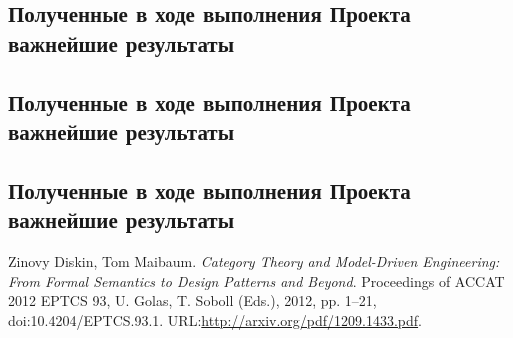 \documentclass[12pt,a4paper]{ltxdoc}
\begin{document}
\subsection{Полученные в ходе выполнения Проекта важнейшие результаты}
\subsection{Полученные в ходе выполнения Проекта важнейшие результаты}
\subsection{Полученные в ходе выполнения Проекта важнейшие результаты}




\begin{thebibliography}{9}
 Zinovy Diskin, Tom Maibaum. \emph{Category Theory and
    Model-Driven Engineering: From Formal Semantics to Design Patterns and Beyond}. Proceedings of ACCAT 2012
EPTCS 93, U. Golas, T. Soboll (Eds.), 2012, pp. 1–21, doi:10.4204/EPTCS.93.1. URL:\url{http://arxiv.org/pdf/1209.1433.pdf}.
\end{thebibliography}




\end{document}
